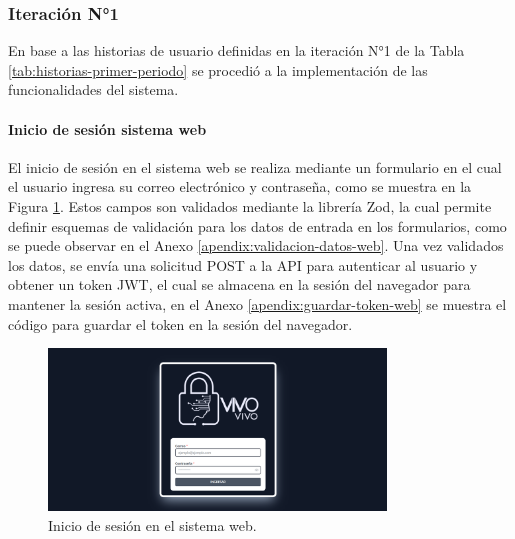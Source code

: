 \subsubsection{Iteración N°1}

En base a las historias de usuario definidas en la iteración N°1 de la Tabla \ref{tab:historias-primer-periodo} se procedió a la implementación
de las funcionalidades del sistema.

\paragraph{Inicio de sesión sistema web}
El inicio de sesión en el sistema web se realiza mediante un formulario en el cual el usuario ingresa su correo electrónico y
contraseña, como se muestra en la Figura \ref{fig:inicio-sesion-web}. Estos campos son validados mediante la librería Zod, la
cual permite definir esquemas de validación para los datos de entrada en los formularios, como se puede observar en el Anexo
\ref{apendix:validacion-datos-web}. Una vez validados los datos, se envía una solicitud POST a la API para autenticar al usuario
y obtener un token JWT, el cual se almacena en la sesión del navegador para mantener la sesión activa, en el Anexo
\ref{apendix:guardar-token-web} se muestra el código para guardar el token en la sesión del navegador.

\begin{figure}[H]
    \centering
    \includegraphics[width=0.8\textwidth]{chapters/III-resultados-y-discusion/resources/images/inicio-sesion-web.png}
    \caption{Inicio de sesión en el sistema web.}
    \label{fig:inicio-sesion-web}
\end{figure}


